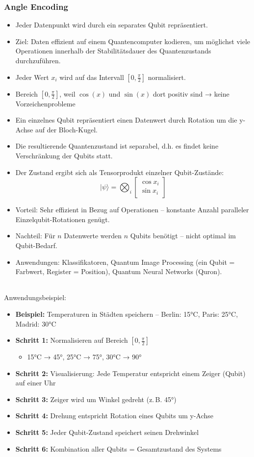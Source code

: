 \subsubsection{Angle Encoding}

\begin{itemize}
\item Jeder Datenpunkt wird durch ein separates Qubit repräsentiert.
\item Ziel: Daten effizient auf einem Quantencomputer kodieren, um möglichst viele Operationen innerhalb der Stabilitätsdauer des Quantenzustands durchzuführen.
\item Jeder Wert \(x_i\) wird auf das Intervall \([0, \frac{\pi}{2}]\) normalisiert.
\item Bereich \([0, \frac{\pi}{2}]\), weil \(\cos(x)\) und \(\sin(x)\) dort positiv sind → keine Vorzeichenprobleme
\item Ein einzelnes Qubit repräsentiert einen Datenwert durch  Rotation um die y-Achse auf der Bloch-Kugel.
\item Die resultierende Quantenzustand ist separabel, d.h. es findet keine Verschränkung der Qubits statt.
\item Der Zustand ergibt sich als Tensorprodukt einzelner Qubit-Zustände: 
\[
|\psi\rangle = \bigotimes_i \begin{bmatrix} \cos x_i \\ \sin x_i \end{bmatrix}
\]
\item Vorteil: Sehr effizient in Bezug auf Operationen – konstante Anzahl paralleler Einzelqubit-Rotationen genügt.
\item Nachteil: Für \(n\) Datenwerte werden \(n\) Qubits benötigt – nicht optimal im Qubit-Bedarf.
\item Anwendungen: Klassifikatoren, Quantum Image Processing (ein Qubit = Farbwert, Register = Position), Quantum Neural Networks (Quron).
\end{itemize}
\cite{encoding patterns for quantum algorithms}
\\


Anwendungsbeispiel:
\begin{itemize}
\item \textbf{Beispiel:} Temperaturen in Städten speichern – Berlin: 15°C, Paris: 25°C, Madrid: 30°C
\item \textbf{Schritt 1:} Normalisieren auf Bereich \([0, \frac{\pi}{2}]\)
  \begin{itemize}
    \item 15°C → 45°, 25°C → 75°, 30°C → 90°
  \end{itemize}
\item \textbf{Schritt 2:} Visualisierung: Jede Temperatur entspricht einem Zeiger (Qubit) auf einer Uhr
\item \textbf{Schritt 3:} Zeiger wird um Winkel gedreht (z.\,B. 45°)
\item \textbf{Schritt 4:} Drehung entspricht Rotation eines Qubits um y-Achse
\item \textbf{Schritt 5:} Jeder Qubit-Zustand speichert seinen Drehwinkel
\item \textbf{Schritt 6:} Kombination aller Qubits = Gesamtzustand des Systems
\end{itemize}


